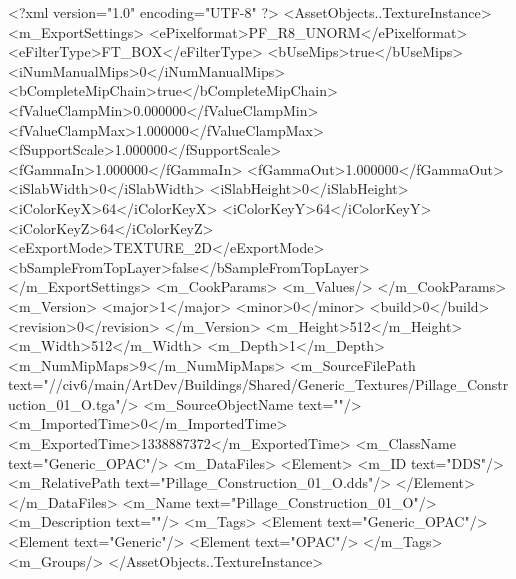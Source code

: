 <?xml version="1.0" encoding="UTF-8" ?>
<AssetObjects..TextureInstance>
	<m_ExportSettings>
		<ePixelformat>PF_R8_UNORM</ePixelformat>
		<eFilterType>FT_BOX</eFilterType>
		<bUseMips>true</bUseMips>
		<iNumManualMips>0</iNumManualMips>
		<bCompleteMipChain>true</bCompleteMipChain>
		<fValueClampMin>0.000000</fValueClampMin>
		<fValueClampMax>1.000000</fValueClampMax>
		<fSupportScale>1.000000</fSupportScale>
		<fGammaIn>1.000000</fGammaIn>
		<fGammaOut>1.000000</fGammaOut>
		<iSlabWidth>0</iSlabWidth>
		<iSlabHeight>0</iSlabHeight>
		<iColorKeyX>64</iColorKeyX>
		<iColorKeyY>64</iColorKeyY>
		<iColorKeyZ>64</iColorKeyZ>
		<eExportMode>TEXTURE_2D</eExportMode>
		<bSampleFromTopLayer>false</bSampleFromTopLayer>
	</m_ExportSettings>
	<m_CookParams>
		<m_Values/>
	</m_CookParams>
	<m_Version>
		<major>1</major>
		<minor>0</minor>
		<build>0</build>
		<revision>0</revision>
	</m_Version>
	<m_Height>512</m_Height>
	<m_Width>512</m_Width>
	<m_Depth>1</m_Depth>
	<m_NumMipMaps>9</m_NumMipMaps>
	<m_SourceFilePath text="//civ6/main/ArtDev/Buildings/Shared/Generic_Textures/Pillage_Construction_01_O.tga"/>
	<m_SourceObjectName text=""/>
	<m_ImportedTime>0</m_ImportedTime>
	<m_ExportedTime>1338887372</m_ExportedTime>
	<m_ClassName text="Generic_OPAC"/>
	<m_DataFiles>
		<Element>
			<m_ID text="DDS"/>
			<m_RelativePath text="Pillage_Construction_01_O.dds"/>
		</Element>
	</m_DataFiles>
	<m_Name text="Pillage_Construction_01_O"/>
	<m_Description text=""/>
	<m_Tags>
		<Element text="Generic_OPAC"/>
		<Element text="Generic"/>
		<Element text="OPAC"/>
	</m_Tags>
	<m_Groups/>
</AssetObjects..TextureInstance>

